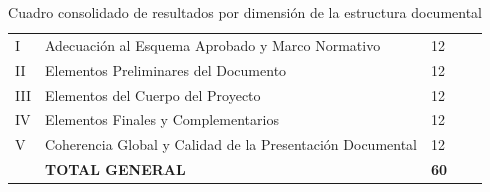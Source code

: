 \begin{table}[htbp]
\centering
\scriptsize
\caption{Cuadro consolidado de resultados por dimensión de la estructura documental}\label{tab:consolidado-estructura-documental}
\begin{tabularx}{\textwidth}{|C{0.8cm}|L{7.5cm}|C{1.8cm}|C{1.8cm}|X|}
\hline
{}
 &  &  &  &  \\ \hline
I & Adecuación al Esquema Aprobado y Marco Normativo & 12 & & \\ \hline
{}
II & Elementos Preliminares del Documento & 12 & & \\ \hline
III & Elementos del Cuerpo del Proyecto & 12 & & \\ \hline
{}
IV & Elementos Finales y Complementarios & 12 & & \\ \hline
V & Coherencia Global y Calidad de la Presentación Documental & 12 & & \\ \hline
{}
& \textbf{TOTAL GENERAL} & \textbf{60} & & \\ \hline
\end{tabularx}
\normalsize
\end{table}

